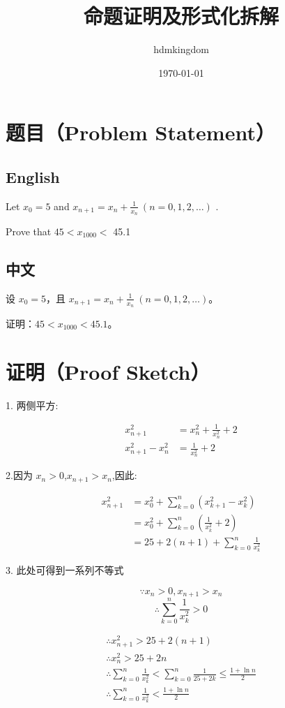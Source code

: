 \documentclass[11pt]{article}
\title{命题证明及形式化拆解}
\author{hdmkingdom}
\date{\today}
\begin{document}
\maketitle

\section*{题目（Problem Statement）}

\subsection*{English}
Let $x_{0}=5$ and $x_{n+1}=x_{n}+\frac{1} {x_{n}} ~ ( n=0, 1, 2, \ldots)$ . 

Prove that $4 5 < x_{1 0 0 0} <$ 45.1

\subsection*{中文}
设 $x_{0}=5$，且 $x_{n+1}=x_{n}+\frac{1}{x_{n}} ~ (n=0, 1, 2, \ldots)$。

证明：$45 < x_{1000} < 45.1$。

\section*{证明（Proof Sketch）}

1. 两侧平方:

\begin{align}
x_{n+1}^2 &= x_n^2 + \frac{1}{x_n^2} + 2\\
x_{n+1}^2 - x_n^2 &= \frac{1}{x_n^2} + 2 \label{eq:formula2}
\end{align}

2.因为 $x_n > 0$,$x_{n+1} > x_n$,因此:

\begin{align}
x_{n+1}^2 & = x_0^2 + \sum_{k=0}^{n}(x_{k+1}^2 - x_k^2)\\
& = x_0^2 + \sum_{k=0}^{n}(\frac{1}{x_k^2} + 2) \\
& = 25 + 2(n+1) + \sum_{k=0}^{n}\frac{1}{x_k^2} \label{eq:formula5} 
\end{align}

3. 此处可得到一系列不等式

\[\because x_n > 0, x_{n+1} > x_n\]
\[\therefore \sum_{k=0}^{n}\frac{1}{x_k^2} > 0\]

\begin{align}
    \therefore x_{n+1}^2 > 25 + 2(n + 1) \\
    \therefore x_{n}^2 > 25 + 2n \\
    \therefore \sum_{k=0}^{n}\frac{1}{x_k^2} < \sum_{k=0}^{n}\frac{1}{25 + 2k} \le \frac{1 + \ln n}{2} \\
    \therefore \sum_{k=0}^{n}\frac{1}{x_k^2} < \frac{1 + \ln n}{2}
\end{align}
\end{document}
